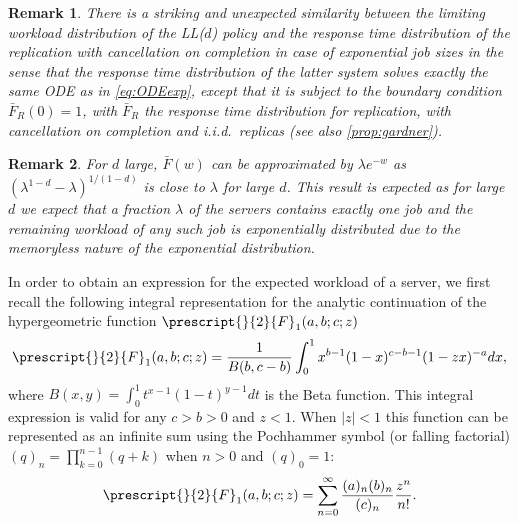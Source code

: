\documentclass[12pt]{report}
\newtheorem{remark}{Remark}
\begin{document}
\begin{remark}
There is a striking and unexpected similarity between the limiting workload distribution of the LL($d$) policy
and the response time distribution of the replication with cancellation on completion \cite[Section 5]{gardnerOR} in case of exponential
job sizes in the sense that the response time distribution of the latter system solves exactly
the same ODE as in \eqref{eq:ODEexp}, except that it is subject to the boundary condition $\bar{F}_R(0) = 1$, with $\bar{F}_R$ the response time distribution for replication, with cancellation on completion and i.i.d.~replicas (see also \eqref{prop:gardner}).
\end{remark}


\begin{remark}
For $d$ large, $\bar{F}(w)$ can be approximated by $\lambda e^{-w}$
as $(\lambda^{1-d} - \lambda) ^{1/(1-d)}$ is close to $\lambda$ for large $d$.
This result is expected as for large $d$ we expect that a fraction $\lambda$ of the
servers contains exactly one job and the remaining workload of any such job is
exponentially distributed due to the memoryless nature of the exponential distribution.
\end{remark}

In order to obtain an expression for the expected workload of a server, we first recall the following 
integral representation for the analytic continuation of the hypergeometric function $\prescript{}{2}{F}_1(a,b;c;z)$ 
\cite[Chapter 15]{abramowitz64}
\begin{align}\label{eq:int2F1}
\prescript{}{2}{F}_1(a,b;c;z) = \frac{1}{B(b,c-b)} \int_{0}^1 x^{b-1} (1-x)^{c-b-1} (1-zx)^{-a} dx,
\end{align}
where $B(x,y) = \int_0^1 t^{x-1} (1-t)^{y-1} dt$ is the Beta function. 
This integral expression is valid for any $c > b > 0$ and $z < 1$. When $|z| < 1$ this function can be represented
as an infinite sum using the Pochhammer symbol (or falling factorial) $(q)_n = \prod_{k=0}^{n-1} (q+k)$ when
$n > 0$ and $(q)_0 = 1$: 
\begin{align}\label{eq:sum2F1}
\prescript{}{2}{F}_1(a,b;c;z) = \sum_{n=0}^\infty \frac{(a)_n(b)_n}{(c)_n} \frac{z^n}{n!}.
\end{align}
\end{document}
